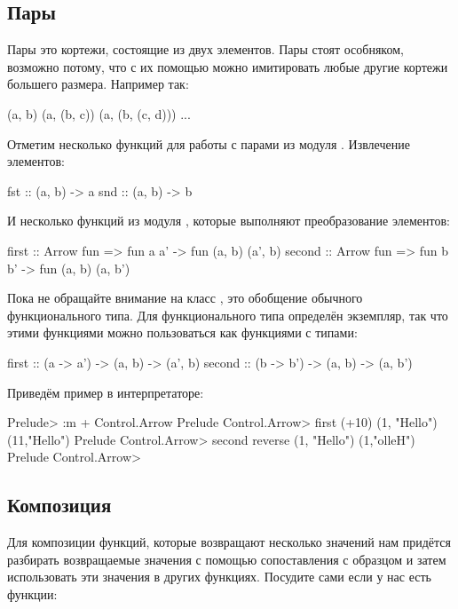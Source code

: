 \subsection{Пары}

Пары это кортежи, состоящие из двух элементов. Пары стоят особняком,
возможно потому, что с их помощью можно имитировать любые 
другие кортежи большего размера. Например так:

\begin{code}
(a, b)
(a, (b, c))
(a, (b, (c, d)))
...
\end{code}

Отметим несколько функций для работы с парами 
из модуля . Извлечение элементов:

\begin{code}
fst :: (a, b) -> a
snd :: (a, b) -> b
\end{code}

И несколько функций из модуля ,
которые выполняют преобразование элементов:

\begin{code}
first  :: Arrow fun => fun a a' -> fun (a, b) (a', b)
second :: Arrow fun => fun b b' -> fun (a, b) (a, b')
\end{code}

Пока не обращайте внимание на класс , это
обобщение обычного функционального типа. Для функционального
типа определён экземпляр, так что этими функциями можно
пользоваться как функциями с типами:

\begin{code}
first  :: (a -> a') -> (a, b) -> (a', b)
second :: (b -> b') -> (a, b) -> (a, b')
\end{code}

Приведём пример в интерпретаторе:

\begin{code}
Prelude> :m + Control.Arrow
Prelude Control.Arrow> first (+10) (1, "Hello")
(11,"Hello")
Prelude Control.Arrow> second reverse (1, "Hello")
(1,"olleH")
Prelude Control.Arrow> 
\end{code}

\subsection{Композиция}

Для композиции функций, которые возвращают несколько
значений нам придётся разбирать возвращаемые значения
с помощью сопоставления с образцом и затем использовать
эти значения в других функциях. Посудите сами если у нас
есть функции:

